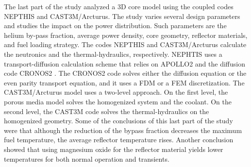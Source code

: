 \documentclass[11pt,letterpaper]{article}
\begin{document}
The last part of the study analyzed a 3D core model using the coupled codes NEPTHIS \cite{cavalier_presentation_2005} and CAST3M/Arcturus.
The study varies several design parameters and studies the impact on the power distribution.
Such parameters are the helium by-pass fraction, average power density, core geometry, reflector materials, and fuel loading strategy.
The codes NEPTHIS and CAST3M/Arcturus calculate the neutronics and the thermal-hydraulics, respectively.
NEPHTIS uses a transport-diffusion calculation scheme that relies on APOLLO2 and the diffusion code CRONOS2 \cite{lautard_cronos_1990}.
The CRONOS2 code solves either the diffusion equation or the even parity transport equation, and it uses a \gls{FDM} or a \gls{FEM} discretization.
The CAST3M/Arcturus model uses a two-level approach.
On the first level, the porous media model solves the homogenized system and the coolant.
On the second level, the CAST3M code solves the thermal-hydraulics on the homogenized geometry.
Some of the conclusions of this last part of the study were that although the reduction of the bypass fraction decreases the maximum fuel temperature, the average reflector temperature rises.
Another conclusion showed that using magnesium oxide for the reflector material yields lower temperatures for both normal operation and transients.





\end{document}
